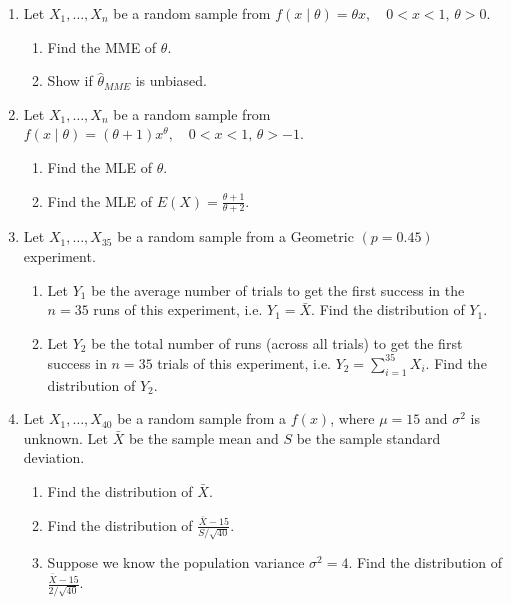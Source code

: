\documentclass{article}
\newcommand{\vecn}[2]{#1_1, \ldots, #1_{#2}}	%
\begin{document}
\begin{enumerate}
    \item Let $\vecn{X}{n}$ be a random sample from $f(x \mid \theta) = \theta x, \quad 0 < x < 1, \, \theta > 0$.%
    \begin{enumerate}
        \item Find the MME of $\theta$.\vspace{140pt}
        \item Show if $\hat{\theta}_{MME}$ is unbiased.\vspace{60pt}
    \end{enumerate}
    
    \item  Let $\vecn{X}{n}$ be a random sample from $f(x \mid \theta) = (\theta + 1) x ^{\theta}, \quad 0 < x < 1, \, \theta > -1$.%
    \begin{enumerate}
        \item Find the MLE of $\theta$.\vspace{320pt}
        \item Find the MLE of $\displaystyle E(X) = \frac{\theta+1}{\theta+2}$.\vspace{60pt}
    \end{enumerate}\newpage
    
    \item Let $\vecn{X}{35}$ be a random sample from a $\text{Geometric }(p = 0.45)$ experiment.%
    \begin{enumerate}
        \item Let $Y_1$ be the average number of trials to get the first success in the $n = 35$ runs of this experiment, i.e. $Y_1 = \bar{X}$. Find the distribution of $Y_1$.\vspace{80pt}
        \item Let $Y_2$ be the total number of runs (across all trials) to get the first success in $n = 35$ trials of this experiment, i.e. $Y_2 = \sum_{i = 1}^{35} X_i$. Find the distribution of $Y_2$.\vspace{80pt}
    \end{enumerate}
    
    \item Let $\vecn{X}{40}$ be a random sample from a $f(x)$, where $\mu = 15$ and $\sigma^2$ is unknown. Let $\bar{X}$ be the sample mean and $S$ be the sample standard deviation.%
    \begin{enumerate}
        \item Find the distribution of $\bar{X}$.\vspace{80pt}
        \item Find the distribution of $\displaystyle \frac{\bar{X} - 15}{S / \sqrt{40}}$.\vspace{80pt}
        \item Suppose we know the population variance $\sigma^2 = 4$. Find the distribution of $\displaystyle \frac{\bar{X} - 15}{2 / \sqrt{40}}$.\vspace{80pt}
    \end{enumerate}
    
\end{enumerate}
\end{document}
